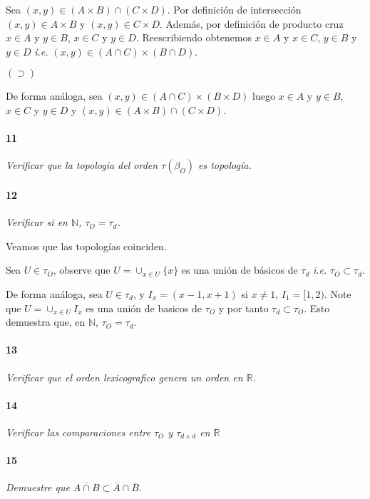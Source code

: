 \documentclass[12pt]{article}
\begin{document}
Sea $(x,y) \in (A \times B) \cap (C \times D)$. Por definición de intersección $(x,y)\in A\times B$ y $(x,y) \in C\times D$. Además, por definición
de producto cruz $x \in A $ y $y \in B$, $x \in C$ y $y \in D$. Reescribiendo obtenemos $x\in A$ y $x\in C$, $y \in B$ y $y\in D$ \textit{i.e.}  $(x,y) \in (A \cap C)\times (B \cap D)$.

$(\supset)$

De forma análoga, sea $(x,y) \in (A \cap C) \times (B \times D)$ luego  $x \in A $ y $y \in B$, $x \in C$ y $y \in D$ y $(x,y) \in (A \times B) \cap (C \times D)$.

\paragraph{11}
\textit{Verificar que la topologia del orden $\tau(\beta_O)$ es topología.}

\paragraph{12}
\textit{Verificar si en $\mathbb{N}$,  $\tau_O =\tau_d$.}

Veamos que las topologías coinciden.

Sea $U \in \tau_O$, observe que $U= \cup_{x\in U} \{x\}$ es una unión de básicos de $\tau_d$ \textit{i.e.} $\tau_O \subset \tau_d$.

De forma análoga, sea $U \in \tau_d$, y $I_x=(x-1,x+1)$ si $x \neq 1$, $I_1=[1,2)$. Note que $U=\cup_{x\in U} I_x$ es una unión de 
basicos de $\tau_O$ y por tanto $\tau_d \subset \tau_O$. Esto demuestra que, en $\mathbb{N}$, $\tau_O =\tau_d$.

\paragraph{13}
\textit{Verificar que el orden lexicografico genera un orden en $\mathbb{R}$.}

\paragraph{14}
\textit{Verificar las comparaciones entre $\tau_O$ y $\tau_{d\times d}$ en $\mathbb{R}$}

\paragraph{15}
\textit{Demuestre que $\overline{A \cap B} \subset \overline{A} \cap \overline{B}$.}
\end{document}
